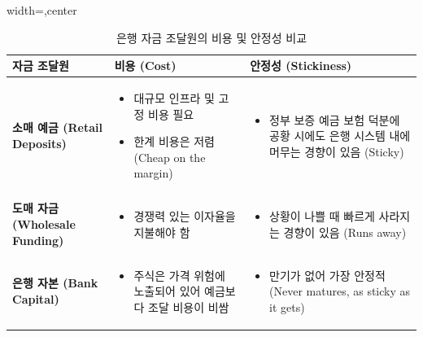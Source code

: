 \documentclass[11pt,a4paper]{article}
\begin{document}
\begin{table}[h!]
    \centering
    \caption{은행 자금 조달원의 비용 및 안정성 비교}
    \label{tab:funding_comparison}
    \begin{adjustbox}{width=\textwidth,center}
    \begin{tabular}{p{}p{}p{}}
        \toprule
        \textbf{자금 조달원} & \textbf{비용 (Cost)} & \textbf{안정성 (Stickiness)} \\
        \midrule
        \textbf{소매 예금 (Retail Deposits)} &
        \begin{itemize}
            \item 대규모 인프라 및 고정 비용 필요
            \item 한계 비용은 저렴 (Cheap on the margin)
        \end{itemize} &
        \begin{itemize}
            \item 정부 보증 예금 보험 덕분에 공황 시에도 은행 시스템 내에 머무는 경향이 있음 (Sticky)
        \end{itemize} \\
        \addlinespace
        \textbf{도매 자금 (Wholesale Funding)} &
        \begin{itemize}
            \item 경쟁력 있는 이자율을 지불해야 함
        \end{itemize} &
        \begin{itemize}
            \item 상황이 나쁠 때 빠르게 사라지는 경향이 있음 (Runs away)
        \end{itemize} \\
        \addlinespace
        \textbf{은행 자본 (Bank Capital)} &
        \begin{itemize}
            \item 주식은 가격 위험에 노출되어 있어 예금보다 조달 비용이 비쌈
        \end{itemize} &
        \begin{itemize}
            \item 만기가 없어 가장 안정적 (Never matures, as sticky as it gets)
        \end{itemize} \\
        \bottomrule
    \end{tabular}
    \end{adjustbox}
\end{table}

\newpage
\end{document}
